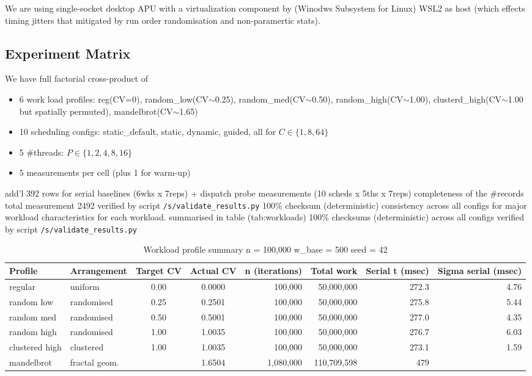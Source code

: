 \documentclass[conference]{IEEEtran}
\begin{document}
We are using single-socket desktop APU with a virtualization component by (Winodws Subsystem for Linux) WSL2 as host (which effects timing jitters that mitigated by run order randomisation and non-paramertic stats).

\subsection{Experiment Matrix}

We have full factorial cross-product of

\begin{itemize}
    \item 6 work load profiles: reg(CV=0), random\_low(CV$\sim$0.25), random\_med(CV$\sim$0.50), random\_high(CV$\sim$1.00), clusterd\_high(CV$\sim$1.00 but spatially permuted), mandelbrot(CV$\sim$1.65)
    \item 10 scheduling configs: static\_default, static, dynamic, guided, all for $C \in \{1, 8, 64\}$
    \item 5 \#threads: $P \in \{1, 2, 4, 8, 16\}$
    \item 5 measurements per cell (plus 1 for warm-up)
\end{itemize}

add'l 392 rows for serial baselines (6wks x 7reps) + dispatch probe measurements (10 scheds x 5ths x 7reps) completeness of the \#records total measurement 2492 verified by script \texttt{/s/validate\_results.py} 100\% checksum (deterministic) consistency across all configs for major workload characteristics for each workload. summarised in table (tab:workloads) 100\% checksums (deterministic) across all configs verified by script \texttt{/s/validate\_results.py}

\begin{table}[t]
\centering
\caption{Workload profile summary n = 100,000 w\_base = 500 seed = 42}
\label{tab:workloads}
\begin{tabular}{l l c c r r r r}
\hline
\textbf{Profile} & \textbf{Arrangement} & \textbf{Target CV} & \textbf{Actual CV} & \textbf{n (iterations)} & \textbf{Total work} & \textbf{Serial t (msec)} & \textbf{Sigma serial (msec)} \\
\hline
regular & uniform & 0.00 & 0.0000 & 100,000 & 50,000,000 & 272.3 & 4.76 \\
random low & randomised & 0.25 & 0.2501 & 100,000 & 50,000,000 & 275.8 & 5.44 \\
random med & randomised & 0.50 & 0.5001 & 100,000 & 50,000,000 & 277.0 & 4.35 \\
random high & randomised & 1.00 & 1.0035 & 100,000 & 50,000,000 & 276.7 & 6.03 \\
clustered high & clustered & 1.00 & 1.0035 & 100,000 & 50,000,000 & 273.1 & 1.59 \\
mandelbrot & fractal geom. & & 1.6504 & 1,080,000 & 110,709,598 & 479 & \\
\hline
\end{tabular}
\end{table}
\end{document}
